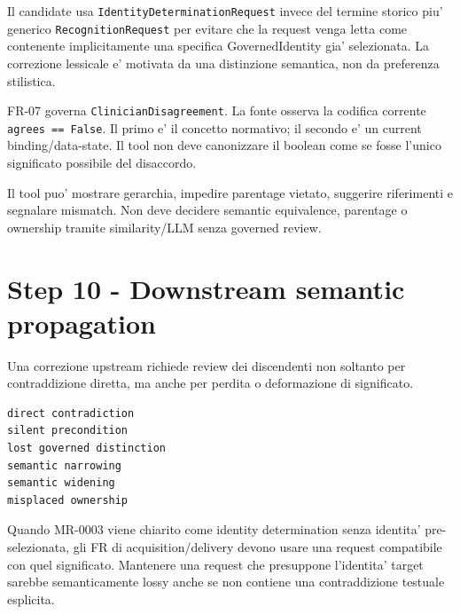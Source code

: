 \documentclass[11pt,a4paper]{article}
\begin{document}
\begin{ddtaexample}[title={Facial Access - terminologia che corregge una ambiguita'}]
Il candidate usa \texttt{IdentityDeterminationRequest} invece del termine storico piu' generico \texttt{RecognitionRequest} per evitare che la request venga letta come contenente implicitamente una specifica GovernedIdentity gia' selezionata. La correzione lessicale e' motivata da una distinzione semantica, non da preferenza stilistica.
\end{ddtaexample}

\begin{ddtaexample}[title={DermaTriage - semantic concept vs current encoding}]
FR-07 governa \texttt{ClinicianDisagreement}. La fonte osserva la codifica corrente \texttt{agrees == False}. Il primo e' il concetto normativo; il secondo e' un current binding/data-state. Il tool non deve canonizzare il boolean come se fosse l'unico significato possibile del disaccordo.
\end{ddtaexample}

\begin{ddtaprinciple}[title={Tool authority boundary}]
Il tool puo' mostrare gerarchia, impedire parentage vietato, suggerire riferimenti e segnalare mismatch. Non deve decidere semantic equivalence, parentage o ownership tramite similarity/LLM senza governed review.
\end{ddtaprinciple}

\section{Step 10 - Downstream semantic propagation}
\workingtag

Una correzione upstream richiede review dei discendenti non soltanto per contraddizione diretta, ma anche per perdita o deformazione di significato.

\begin{lstlisting}
direct contradiction
silent precondition
lost governed distinction
semantic narrowing
semantic widening
misplaced ownership
\end{lstlisting}

\begin{ddtaexample}[title={Facial Access - propagation da MR a FR}]
Quando MR-0003 viene chiarito come identity determination senza identita' pre-selezionata, gli FR di acquisition/delivery devono usare una request compatibile con quel significato. Mantenere una request che presuppone l'identita' target sarebbe semanticamente lossy anche se non contiene una contraddizione testuale esplicita.
\end{ddtaexample}
\end{document}
